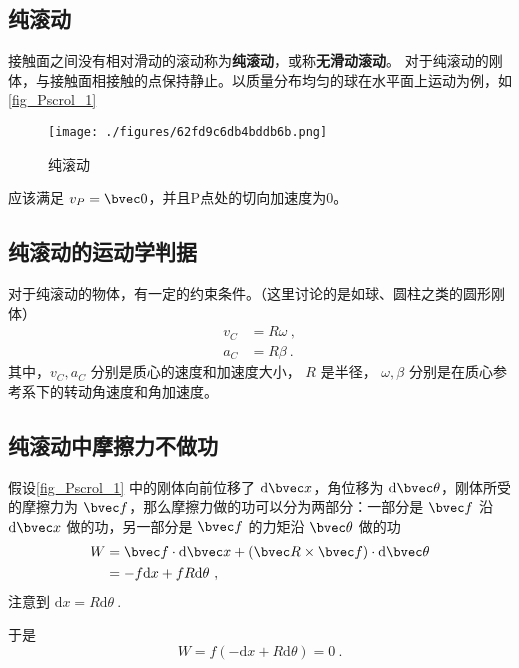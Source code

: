 

\subsection{纯滚动}
接触面之间没有相对滑动的滚动称为\textbf{纯滚动}，或称\textbf{无滑动滚动}。
对于纯滚动的刚体，与接触面相接触的点保持静止。以质量分布均匀的球在水平面上运动为例，如\autoref{fig_Pscrol_1}
\begin{figure}[ht]
\centering
\texttt{[image: ./figures/62fd9c6db4bddb6b.png]}
\caption{纯滚动} \label{fig_Pscrol_1}
\end{figure}
应该满足 $v_P=\bvec 0$，并且P点处的切向加速度为0。

\subsection{纯滚动的运动学判据}
对于纯滚动的物体，有一定的约束条件。（这里讨论的是如球、圆柱之类的圆形刚体）
\begin{equation}
\begin{aligned}
v_C&=R\omega~,\\
a_C&=R\beta~.
\end{aligned}
\end{equation}
其中，$v_C,a_C$
分别是质心的速度和加速度大小，
$R$ 是半径，
$\omega,\beta$ 分别是在质心参考系下的转动角速度和角加速度。

\subsection{纯滚动中摩擦力不做功}
假设\autoref{fig_Pscrol_1} 中的刚体向前位移了 $\mathrm{d}\bvec x$，角位移为 $\mathrm{d} \bvec \theta$，刚体所受的摩擦力为 $\bvec f$，那么摩擦力做的功可以分为两部分：一部分是 $\bvec f$ 沿 $\mathrm{d} \bvec x$ 做的功，另一部分是 $\bvec f$ 的力矩沿 $\bvec \theta$ 做的功
\begin{equation}
\begin{aligned}
W&=\bvec f\cdot\mathrm{d} \bvec x+(\bvec R\times \bvec f)\cdot\mathrm{d} \bvec \theta\\
&=-f\mathrm{d} x+fR\mathrm{d} \theta~,
\end{aligned}
\end{equation}
注意到 $\mathrm{d} x=R\mathrm{d} \theta~.$

于是\begin{equation}
W=f(-\mathrm{d} x+R\mathrm{d} \theta)=0~.
\end{equation}
